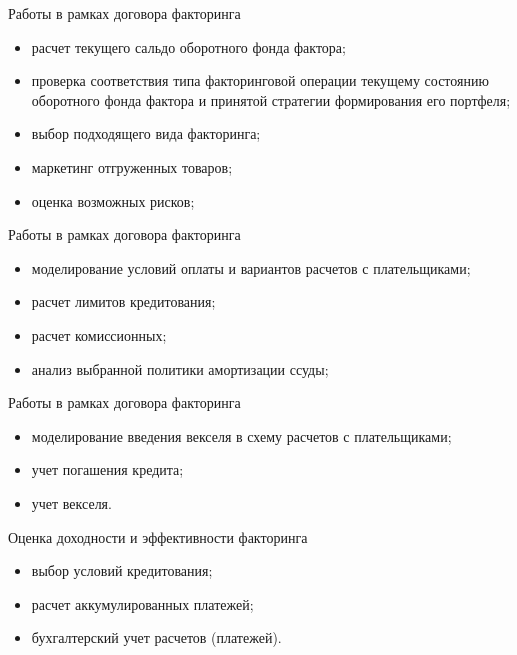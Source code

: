 \documentclass[_Banking_p3.tex]{subfiles}
\begin{document}
\begin{frame}{Работы в рамках договора факторинга}
\begin{itemize}[<+->]
\item
расчет текущего сальдо оборотного фонда фактора;

\item
проверка соответствия типа факторинговой операции текущему состоянию оборотного фонда фактора и принятой стратегии формирования его портфеля;

\item
выбор подходящего вида факторинга;

\item
маркетинг отгруженных товаров;

\item
оценка возможных рисков;

\end{itemize}
\end{frame}
\begin{frame}{Работы в рамках договора факторинга}
\begin{itemize}[<+->]
\item
моделирование условий оплаты и вариантов расчетов с плательщиками;

\item
расчет лимитов кредитования;

\item
расчет комиссионных;

\item
анализ выбранной политики амортизации ссуды;

\end{itemize}
\end{frame}
\begin{frame}{Работы в рамках договора факторинга}
\begin{itemize}[<+->]
\item
моделирование введения векселя в схему расчетов с плательщиками;

\item
учет погашения кредита;

\item
учет векселя.


\end{itemize}

\end{frame}


\begin{frame} {Оценка доходности и эффективности факторинга}
\begin{itemize}[<+->]
\item
выбор условий кредитования;

\item
расчет аккумулированных платежей;

\item
бухгалтерский учет расчетов (платежей).

\end{itemize}

\end{frame}
\end{document}
